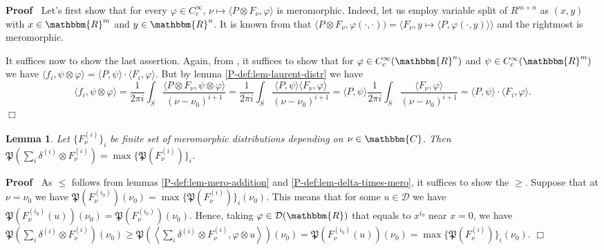 \documentclass{article}
\renewenvironment{proof}{\noindent\textbf{Proof\ }}{\hspace*{\fill}$\Box$\medskip}
\newtheorem{lemma}[proposition]{Lemma}
\theoremstyle{remark}
\begin{document}
\begin{proof}
  Let's first show that for every $\varphi \in C_c^{\infty}$, $\nu \mapsto
  \langle P \otimes F_{\nu}, \varphi \rangle$ is meromorphic. Indeed, let us
  employ variable split of $R^{m + n}$ as $(x, y)$ with $x \in \mathbbm{R}^m$
  and $y \in \mathbbm{R}^n$. It is known from {\cite[thm.
  5.1.1]{hormander1983analysis}} that $\langle P \otimes F_{\nu}, \varphi
  (\cdot, \cdot)) = \langle F_{\nu}, y \mapsto \langle P, \varphi (\cdot, y)
  \rangle \rangle$ and the rightmost is meromorphic.
  
  It suffices now to show the last assertion. Again, from {\cite[thm.
  5.1.1]{hormander1983analysis}}, it suffices to show that for $\varphi \in
  C^{\infty}_c (\mathbbm{R}^n)$ and $\psi \in C_c^{\infty} (\mathbbm{R}^m)$ we
  have $\langle f_i, \psi \otimes \varphi \rangle = \langle P, \psi \rangle
  \cdot \langle F_i, \varphi \rangle$. But by lemma
  \ref{P-def:lem-laurent-distr} we have
  \[ \langle f_i, \psi \otimes \varphi \rangle = \frac{1}{2 \pi i} \int_S
     \frac{\langle P \otimes F_{\nu}, \psi \otimes \varphi \rangle}{(\nu -
     \nu_0)^{i + 1}} = \frac{1}{2 \pi i} \int_S \frac{\langle P, \psi \rangle
     \langle F_{\nu}, \varphi \rangle}{(\nu - \nu_0)^{i + 1}} = \langle P,
     \psi \rangle \frac{1}{2 \pi i} \int_S \frac{\langle F_{\nu}, \varphi
     \rangle}{(\nu - \nu_0)^{i + 1}} = \langle P, \psi \rangle \cdot \langle
     F_i, \varphi \rangle . \]
\end{proof}

\begin{lemma}
  \label{P-def:lem-delta-max}Let $\{ F_{\nu}^{(i)} \}_i$ be finite set of
  meromorphic distributions depending on $\nu \in \mathbbm{C}$. Then
  $\mathfrak{P} \left( \sum_i \delta^{(i)} \otimes F^{(i)}_{\nu} \right) =
  \max \{ \mathfrak{P} (F_{\nu}^{(i)}) \}_i$.
\end{lemma}

\begin{proof}
  As $\leqslant$ follows from lemmas \ref{P-def:lem-mero-addition} and
  \ref{P-def:lem-delta-times-mero}, it suffices to show the $\geqslant$.
  Suppose that at $\nu = \nu_0$ we have $\mathfrak{P} (F_{\nu}^{(i_0)})
  (\nu_0) = \max \{ \mathfrak{P} (F_{\nu}^{(i)}) \}_i (\nu_0)$. This means
  that for some $u \in \mathcal{D}$ we have $\mathfrak{P} (F_{\nu}^{(i_0)}
  (u)) (\nu_0) =\mathfrak{P} (F_{\nu}^{(i_0)}) (\nu_0)$. Hence, taking
  $\varphi \in \mathcal{D} (\mathbbm{R})$ that equals to $x^{i_0}$ near $x =
  0$, we have $\mathfrak{P} \left( \sum_i \delta^{(i)} \otimes F^{(i)}_{\nu}
  \right) (\nu_0) \geqslant \mathfrak{P} \left( \left\langle \sum_i
  \delta^{(i)} \otimes F^{(i)}_{\nu}, \varphi \otimes u \right\rangle \right)
  (\nu_0) =\mathfrak{P} (F_{\nu}^{(i_0)} (u)) (\nu_0) = \max \{ \mathfrak{P}
  (F_{\nu}^{(i)}) \}_i (\nu_0)$.
\end{proof}
\end{document}
